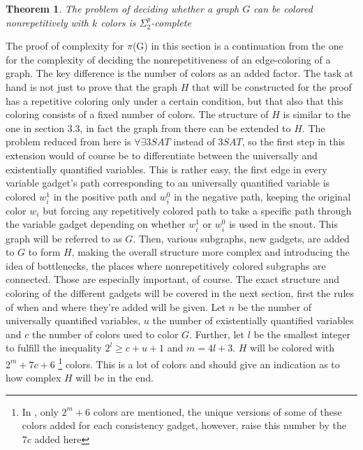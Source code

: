 \documentclass[12pt,a4paper]{article}
\newtheorem{theorem}{Theorem}
\begin{document}
\begin{theorem}
The problem of deciding whether a graph $G$ can be colored nonrepetitively with $k$ colors is $\Sigma^p_2$-complete
\end{theorem}
The proof of complexity for $\pi$(G) in this section is a continuation from the one for the complexity of deciding the nonrepetitiveness of an edge-coloring of a graph. The key difference is the number of colors as an added factor. The task at hand is not just to prove that the graph $H$ that will be constructed for the proof has a repetitive coloring only under a certain condition, but that also that this coloring consists of a fixed number of colors. 
The structure of $H$ is similar to the one in section 3.3, in fact the graph from there can be extended to $H$. The problem reduced from here is $\forall \exists 3SAT$ instead of $3SAT$, so the first step in this extension would of course be to differentiate between the universally and existentially quantified variables. This is rather easy, the first edge in every variable gadget's path corresponding to an universally quantified variable is colored $w^1_i$ in the positive path and $w^0_i$ in the negative path, keeping the original color $w_i$ but forcing any repetitively colored path to take a specific path through the variable gadget depending on whether $w^1_i$ or $w^0_i$ is used in the snout. This graph will be referred to as $G$.
\newline
Then, various subgraphs, new gadgets, are added to $G$ to form $H$, making the overall structure more complex and introducing the idea of bottlenecks, the places where nonrepetitively colored subgraphs are connected. Those are especially important, of course. The exact structure and coloring of the different gadgets will be covered in the next section, first the rules of when and where they're added will be given. Let $n$ be the number of universally quantified variables, $u$ the number of existentially quantified variables and $c$ the number of colors used to color $G$. Further, let $l$ be the smallest integer to fulfill the inequality $2^l \geq c + u + 1$ and $m = 4l +3$. $H$ will be colored with $2^m + 7c + 6$ \footnote{In \citep{Manin2008}, only $2^m +6$ colors are mentioned, the unique versions of some of these colors added for each consistency gadget, however, raise this number by the $7c$ added here} colors. This is a lot of colors and should give an indication as to how complex $H$ will be in the end.
\newline
\end{document}
